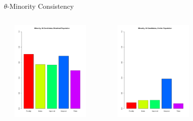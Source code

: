 \documentclass{beamer}
\begin{document}
\begin{frame}{$\theta$-Minority Consistency}
\begin{columns}
             \centering
             \includegraphics[height=5cm, width=5cm]{Presentation_Plots/Minority_20_Candidates_Polarized_Population.pdf}
             
	 \centering
             \includegraphics[height=5cm, width=5cm]{Presentation_Plots/Minority_20_Candidates_Similar_Population.pdf}
         \end{columns} 
\end{frame}
\end{document}
